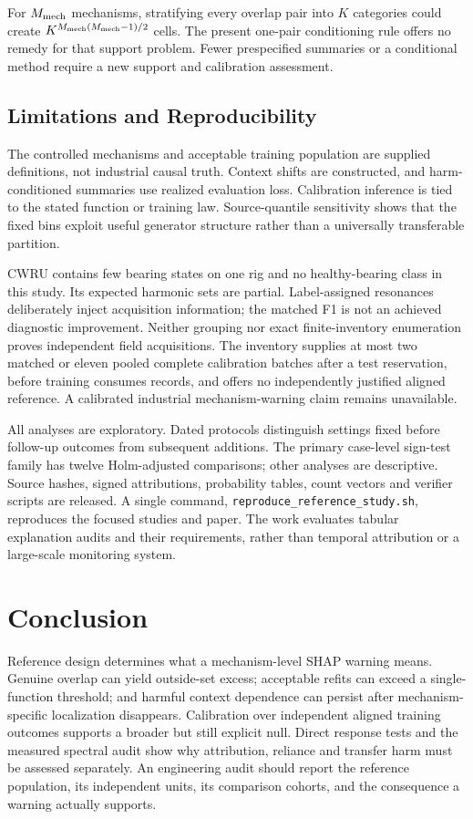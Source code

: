 \documentclass[conference]{IEEEtran}
\begin{document}
For $M_{\rm mech}$ mechanisms, stratifying every overlap pair into $K$ categories could create $K^{M_{\rm mech}(M_{\rm mech}-1)/2}$ cells. The present one-pair conditioning rule offers no remedy for that support problem. Fewer prespecified summaries or a conditional method require a new support and calibration assessment.

\subsection{Limitations and Reproducibility}
The controlled mechanisms and acceptable training population are supplied definitions, not industrial causal truth. Context shifts are constructed, and harm-conditioned summaries use realized evaluation loss. Calibration inference is tied to the stated function or training law. Source-quantile sensitivity shows that the fixed bins exploit useful generator structure rather than a universally transferable partition.

CWRU contains few bearing states on one rig and no healthy-bearing class in this study. Its expected harmonic sets are partial. Label-assigned resonances deliberately inject acquisition information; the matched F1 is not an achieved diagnostic improvement. Neither grouping nor exact finite-inventory enumeration proves independent field acquisitions. The inventory supplies at most two matched or eleven pooled complete calibration batches after a test reservation, before training consumes records, and offers no independently justified aligned reference. A calibrated industrial mechanism-warning claim remains unavailable.

All analyses are exploratory. Dated protocols distinguish settings fixed before follow-up outcomes from subsequent additions. The primary case-level sign-test family has twelve Holm-adjusted comparisons; other analyses are descriptive. Source hashes, signed attributions, probability tables, count vectors and verifier scripts are released. A single command, \texttt{reproduce\_reference\_study.sh}, reproduces the focused studies and paper. The work evaluates tabular explanation audits and their requirements, rather than temporal attribution or a large-scale monitoring system.

\section{Conclusion}
Reference design determines what a mechanism-level SHAP warning means. Genuine overlap can yield outside-set excess; acceptable refits can exceed a single-function threshold; and harmful context dependence can persist after mechanism-specific localization disappears. Calibration over independent aligned training outcomes supports a broader but still explicit null. Direct response tests and the measured spectral audit show why attribution, reliance and transfer harm must be assessed separately. An engineering audit should report the reference population, its independent units, its comparison cohorts, and the consequence a warning actually supports.
\end{document}
